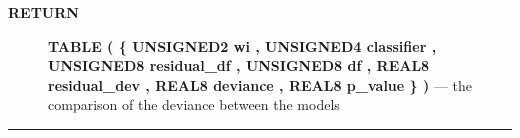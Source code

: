 \par
\begin{description}
\item [\colorbox{tagtype}{\color{white} \textbf{\textsf{RETURN}}}] \textbf{TABLE ( \{ UNSIGNED2 wi , UNSIGNED4 classifier , UNSIGNED8 residual\_df , UNSIGNED8 df , REAL8 residual\_dev , REAL8 deviance , REAL8 p\_value \} )} --- the comparison of the deviance between the models
\end{description}




\rule{\linewidth}{0.5pt}
